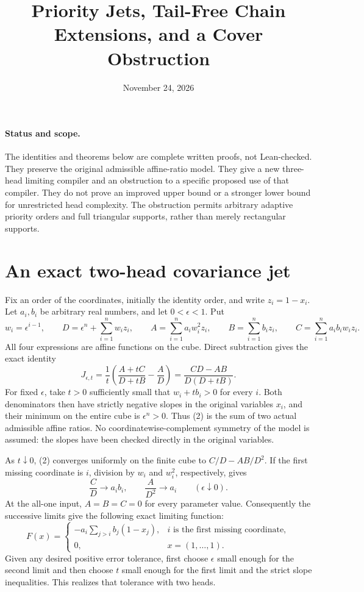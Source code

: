 \documentclass[11pt]{article}
\begin{document}
\title{Priority Jets, Tail-Free Chain Extensions, and a Cover Obstruction}
\author{}
\date{November 24, 2026}
\maketitle

\paragraph{Status and scope.}
The identities and theorems below are complete written proofs, not
Lean-checked. They preserve the original admissible affine-ratio model.
They give a new three-head limiting compiler and an obstruction to a
specific proposed use of that compiler. They do not prove an improved
upper bound or a stronger lower bound for unrestricted head complexity.
The obstruction permits arbitrary adaptive priority orders and full
triangular supports, rather than merely rectangular supports.

\section{An exact two-head covariance jet}

Fix an order of the coordinates, initially the identity order, and write
$z_i=1-x_i$. Let $a_i,b_i$ be arbitrary real numbers, and let
$0<\epsilon<1$. Put
\[
 w_i=\epsilon^{i-1},\qquad
 D=\epsilon^n+\sum_{i=1}^n w_i z_i,\qquad
 A=\sum_{i=1}^n a_i w_i^2z_i,\qquad
 B=\sum_{i=1}^n b_i z_i,\qquad
 C=\sum_{i=1}^n a_i b_i w_i z_i.                 \tag{1}
\]
All four expressions are affine functions on the cube. Direct
subtraction gives the exact identity
\[
 J_{\epsilon,t}
 =\frac1t\left(\frac{A+tC}{D+tB}-\frac A D\right)
 =\frac{CD-AB}{D(D+tB)}.                         \tag{2}
\]
For fixed $\epsilon$, take $t>0$ sufficiently small that
$w_i+t b_i>0$ for every $i$. Both denominators then have strictly
negative slopes in the original variables $x_i$, and their minimum
on the entire cube is $\epsilon^n>0$. Thus (2) is the sum of two
actual admissible affine ratios. No coordinatewise-complement
symmetry of the model is assumed: the slopes have been checked
directly in the original variables.

As $t\downarrow0$, (2) converges uniformly on the finite cube to
$C/D-AB/D^2$. If the first missing coordinate is $i$, division by
$w_i$ and $w_i^2$, respectively, gives
\[
 \frac C D\longrightarrow a_i b_i,
 \qquad \frac A{D^2}\longrightarrow a_i
 \qquad(\epsilon\downarrow0).
\]
At the all-one input, $A=B=C=0$ for every parameter value.
Consequently the successive limits give the following exact limiting
function:
\[
 F(x)=
 \begin{cases}
 -a_i\displaystyle\sum_{j>i} b_j(1-x_j),
       &i\text{ is the first missing coordinate},\\
 0,    &x=(1,\ldots,1).
 \end{cases}                                      \tag{3}
\]
Given any desired positive error tolerance, first choose $\epsilon$
small enough for the second limit and then choose $t$ small enough
for the first limit and the strict slope inequalities. This realizes
that tolerance with two heads.
\end{document}
